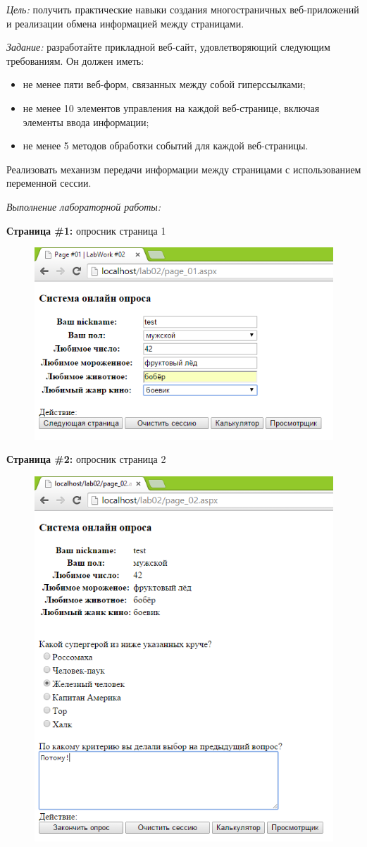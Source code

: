 \documentclass[pscyr]{hedlab}
\begin{document}
  \makeheader

  \emph{Цель:} получить практические навыки создания многостраничных
  веб-приложений и реализации обмена информацией между страницами.
  
  \emph{Задание:} разработайте прикладной веб-сайт, удовлетворяющий следующим
  требованиям. Он должен иметь:
  \begin{itemize}
    \item не менее пяти веб-форм, связанных между собой гиперссылками;
    \item не менее 10 элементов управления на каждой веб-странице, включая
      элементы ввода информации;
    \item не менее 5 методов обработки событий для каждой веб-страницы.
  \end{itemize}
  Реализовать механизм передачи информации между страницами с использованием
  переменной сессии.

  \emph{Выполнение лабораторной работы:}
  
  \textbf{Страница \#1:} опросник страница 1
  \begin{figure}[h!]
    \center
    \includegraphics[width=.47\textwidth]{lab02_01}
  \end{figure}
  
  
  \textbf{Страница \#2:} опросник страница 2
  \begin{figure}[h!]
    \center
    \includegraphics[width=.47\textwidth]{lab02_02}
  \end{figure}
  
  
\end{document}
